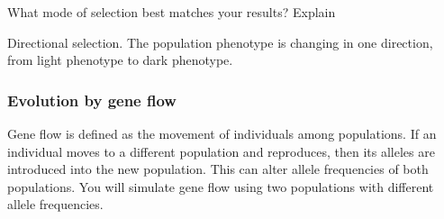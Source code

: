 \documentclass[12pt]{exam}
\newcommand*\AnswerBox[2]{%
    \parbox[t][#1]{0.92\textwidth}{%
    \begin{solution}#2\end{solution}}
    \vspace*{\stretch{1}}
}
\begin{document}
\begin{questions}
\question
What mode of selection best matches your results? Explain

\AnswerBox{1\baselineskip}{Directional selection. The population phenotype is changing in one direction, from light phenotype to dark phenotype.}


\newpage

\subsubsection*{Evolution by gene flow}

Gene flow is defined as the movement of individuals among populations.  If an individual moves to a different population and reproduces, then its alleles are introduced into the new population.  This can alter allele frequencies of both populations. You will simulate gene flow using two populations with different allele frequencies.



\end{questions}
\end{document}
